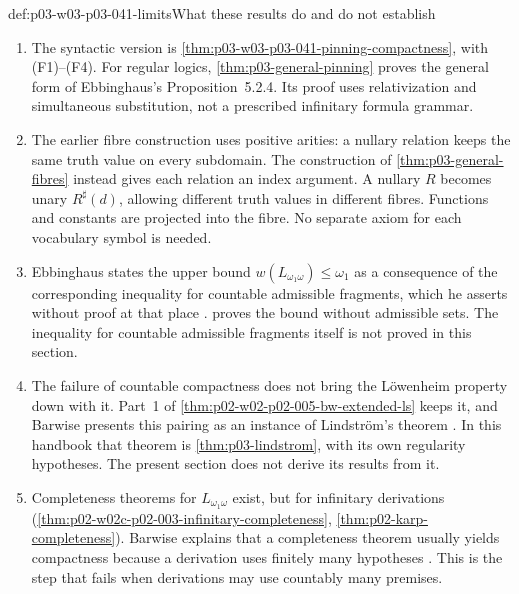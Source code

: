 \begin{hbwarning}{def:p03-w03-p03-041-limits}{What these results do and do not establish}
\begin{enumerate}
\item The syntactic version is
      \cref{thm:p03-w03-p03-041-pinning-compactness}, with (F1)--(F4).
      For regular logics, \cref{thm:p03-general-pinning} proves the
      general form of Ebbinghaus's Proposition~5.2.4. Its proof uses
      relativization and simultaneous substitution, not a prescribed
      infinitary formula grammar.
\item The earlier fibre construction uses positive arities: a nullary
      relation keeps the same truth value on every subdomain.
      The construction of \cref{thm:p03-general-fibres} instead gives
      each relation an index argument. A nullary \(R\) becomes unary
      \(R^\sharp(d)\), allowing different truth values in different fibres.
      Functions and constants are projected into the fibre. No separate
      axiom for each vocabulary symbol is needed.
\item Ebbinghaus states the upper bound
      \(w(L_{\omega_1\omega})\leq\omega_1\) as a consequence of the
      corresponding inequality for countable admissible fragments, which
      he asserts without proof at that place
      \cite[Ch.~II, Example~5.2.3(c), p.~62]{Ebbinghaus1985ExtendedLogics}.
       proves the bound without
      admissible sets. The inequality for countable admissible fragments
      itself is not proved in this section.
\item The failure of countable compactness does not bring the
      L\"owenheim property down with it. Part~1 of
      \cref{thm:p02-w02-p02-005-bw-extended-ls} keeps it, and Barwise
      presents this pairing as an instance of Lindstr\"om's theorem
      \cite[Ch.~I, \S2.1, p.~14]{Barwise1985BackgroundAims}. In this
      handbook that theorem is \cref{thm:p03-lindstrom}, with its own
      regularity hypotheses. The present section does not derive its
      results from it.
\item Completeness theorems for \(L_{\omega_1\omega}\) exist, but for
      infinitary derivations
      (\cref{thm:p02-w02c-p02-003-infinitary-completeness},
      \cref{thm:p02-karp-completeness}). Barwise explains that a
      completeness theorem usually yields compactness because a
      derivation uses finitely many hypotheses
      \cite[Ch.~I, \S1.4, p.~7]{Barwise1985BackgroundAims}. This is the
      step that fails when derivations may use countably many premises.
\end{enumerate}
\end{hbwarning}


